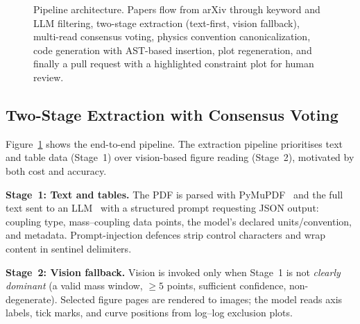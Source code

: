 \documentclass{article}
\begin{document}
\begin{figure}[t]
{
}
\caption{Pipeline architecture. Papers flow from arXiv through keyword and LLM filtering, two-stage extraction (text-first, vision fallback), multi-read consensus voting, physics convention canonicalization, code generation with AST-based insertion, plot regeneration, and finally a pull request with a highlighted constraint plot for human review.}
\label{fig:architecture}
\end{figure}

\subsection{Two-Stage Extraction with Consensus Voting}

Figure~\ref{fig:architecture} shows the end-to-end pipeline. The extraction pipeline prioritises text and table data (Stage~1) over vision-based figure reading (Stage~2), motivated by both cost and accuracy.

\textbf{Stage~1: Text and tables.}
The PDF is parsed with PyMuPDF~\cite{pymupdf} and the full text sent to an LLM~\cite{anthropic_claude} with a structured prompt requesting JSON output: coupling type, mass--coupling data points, the model's declared units/convention, and metadata. Prompt-injection defences strip control characters and wrap content in sentinel delimiters.

\textbf{Stage~2: Vision fallback.}
Vision is invoked only when Stage~1 is not \emph{clearly dominant} (a valid mass window, $\geq 5$ points, sufficient confidence, non-degenerate). Selected figure pages are rendered to images; the model reads axis labels, tick marks, and curve positions from log--log exclusion plots.
\end{document}

